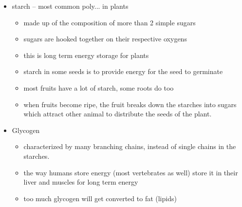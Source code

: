 \documentclass{article}
\theoremstyle{definition}
\begin{document}
\begin{itemize}
\begin{itemize}
			\item starch -- most common poly... in plants
				\begin{itemize}
					\item made up of the composition of more than 2 simple sugars
					\item sugars are hooked together on their respective oxygens
					\item this is long term energy storage for plants
					\item starch in some seeds is to provide energy for the seed to germinate
					\item most fruits have a lot of starch, some roots do too
					\item when fruits become ripe, the fruit breaks down the starches into sugars which attract other animal to distribute the seeds of the plant.
				\end{itemize}
			\item Glycogen
				\begin{itemize}
					\item characterized by many branching chains, instead of single chains in the starches.
					\item the way humans store energy (most vertebrates as well) store it in their liver and muscles for long term energy
					\item too much glycogen will get converted to fat (lipids)
				\end{itemize}
		\end{itemize}
\end{itemize}
\end{document}
